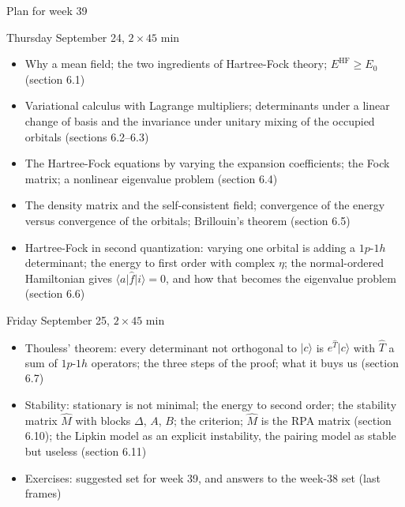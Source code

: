 \documentclass[aspectratio=169,10pt]{beamer}
\newcommand{\ket}[1]{\vert #1\rangle}
\begin{document}
\begin{frame}[shrink=5]{Plan for week 39}
  \scriptsize
  \begin{block}{Thursday September 24, $2\times45$ min}
    \begin{itemize}
      \item Why a mean field; the two ingredients of Hartree-Fock theory; $E^{\mathrm{HF}}\ge E_0$ (section 6.1)
      \item Variational calculus with Lagrange multipliers; determinants under a linear change of basis and the invariance under unitary mixing of the occupied orbitals (sections 6.2--6.3)
      \item The Hartree-Fock equations by varying the expansion coefficients; the Fock matrix; a nonlinear eigenvalue problem (section 6.4)
      \item The density matrix and the self-consistent field; convergence of the energy versus convergence of the orbitals; Brillouin's theorem (section 6.5)
      \item Hartree-Fock in second quantization: varying one orbital is adding a $1p$-$1h$ determinant; the energy to first order with complex $\eta$; the normal-ordered Hamiltonian gives $\langle a\vert\hat{f}\vert i\rangle=0$, and how that becomes the eigenvalue problem (section 6.6)
    \end{itemize}
  \end{block}
  \begin{block}{Friday September 25, $2\times45$ min}
    \begin{itemize}
      \item Thouless' theorem: every determinant not orthogonal to $\ket{c}$ is $e^{\hat{T}}\ket{c}$ with $\hat{T}$ a sum of $1p$-$1h$ operators; the three steps of the proof; what it buys us (section 6.7)
      \item Stability: stationary is not minimal; the energy to second order; the stability matrix $\hat{M}$ with blocks $\Delta$, $A$, $B$; the criterion; $\hat{M}$ is the RPA matrix (section 6.10); the Lipkin model as an explicit instability, the pairing model as stable but useless (section 6.11)
      \item Exercises: suggested set for week 39, and answers to the week-38 set (last frames)
    \end{itemize}
  \end{block}
\end{frame}

\end{document}
